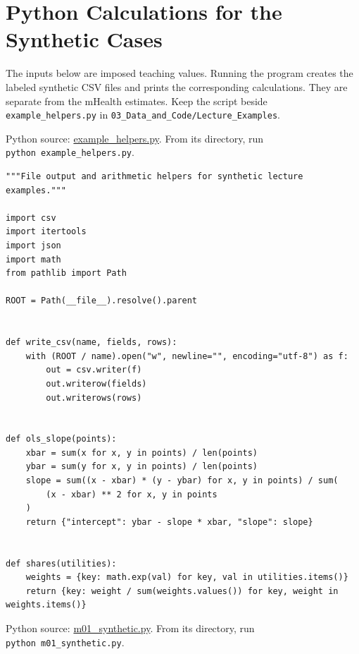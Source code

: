 \hypertarget{M01-python-calculations-for-the-synthetic-cases}{%
\section{Python Calculations for the Synthetic
Cases}\label{M01-python-calculations-for-the-synthetic-cases}}

\noindent The inputs below are imposed teaching values. Running the program
creates the labeled synthetic CSV files and prints the corresponding
calculations. They are separate from the mHealth estimates. Keep the
script beside \texttt{example\_helpers.py} in
\texttt{03\_Data\_and\_Code/Lecture\_Examples}.

\FloatBarrier
{}
Python source:
\href{../03_Data_and_Code/Lecture_Examples/example_helpers.py}{example\_helpers.py}.
From its directory, run \texttt{python\ example\_helpers.py}.

\begin{Verbatim}[breaklines,breakanywhere,fontsize=\small]
"""File output and arithmetic helpers for synthetic lecture examples."""

import csv
import itertools
import json
import math
from pathlib import Path

ROOT = Path(__file__).resolve().parent


def write_csv(name, fields, rows):
    with (ROOT / name).open("w", newline="", encoding="utf-8") as f:
        out = csv.writer(f)
        out.writerow(fields)
        out.writerows(rows)


def ols_slope(points):
    xbar = sum(x for x, y in points) / len(points)
    ybar = sum(y for x, y in points) / len(points)
    slope = sum((x - xbar) * (y - ybar) for x, y in points) / sum(
        (x - xbar) ** 2 for x, y in points
    )
    return {"intercept": ybar - slope * xbar, "slope": slope}


def shares(utilities):
    weights = {key: math.exp(val) for key, val in utilities.items()}
    return {key: weight / sum(weights.values()) for key, weight in weights.items()}
\end{Verbatim}

\FloatBarrier
{}
Python source:
\href{../03_Data_and_Code/Lecture_Examples/m01_synthetic.py}{m01\_synthetic.py}.
From its directory, run \texttt{python\ m01\_synthetic.py}.

